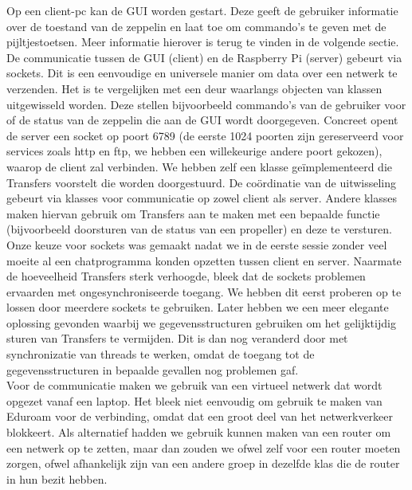 \documentclass[eind]{penoverslag}
\begin{document}
Op een client-pc kan de GUI worden gestart. Deze geeft de gebruiker informatie over de toestand van de zeppelin en laat toe om commando's te geven met de pijltjestoetsen. Meer informatie hierover is terug te vinden in de volgende sectie. \\

De communicatie tussen de GUI (client) en de Raspberry Pi (server) gebeurt via sockets. Dit is een eenvoudige en universele manier om data over een netwerk te verzenden. Het is te vergelijken met een deur waarlangs objecten van klassen uitgewisseld worden. Deze stellen bijvoorbeeld commando's van de gebruiker voor of de status van de zeppelin die aan de GUI wordt doorgegeven. Concreet opent de server een socket op poort 6789 (de eerste 1024 poorten zijn gereserveerd voor services zoals http en ftp, we hebben een willekeurige andere poort gekozen), waarop de client zal verbinden. We hebben zelf een klasse ge\"implementeerd die Transfers voorstelt die worden doorgestuurd. De co\"ordinatie van de uitwisseling gebeurt via klasses voor communicatie op zowel client als server. Andere klasses maken hiervan gebruik om Transfers aan te maken met een bepaalde functie (bijvoorbeeld doorsturen van de status van een propeller) en deze te versturen. \\

Onze keuze voor sockets was gemaakt nadat we in de eerste sessie zonder veel moeite al een chatprogramma konden opzetten tussen client en server. Naarmate de hoeveelheid Transfers sterk verhoogde, bleek dat de sockets problemen ervaarden met ongesynchroniseerde toegang. We hebben dit eerst proberen op te lossen door meerdere sockets te gebruiken. Later hebben we een meer elegante oplossing gevonden waarbij we gegevensstructuren gebruiken om het gelijktijdig sturen van Transfers te vermijden. Dit is dan nog veranderd door met synchronizatie van threads te werken, omdat de toegang tot de gegevensstructuren in bepaalde gevallen nog problemen gaf. \\

Voor de communicatie maken we gebruik van een virtueel netwerk dat wordt opgezet vanaf een laptop. Het bleek niet eenvoudig om gebruik te maken van Eduroam voor de verbinding, omdat dat een groot deel van het netwerkverkeer blokkeert. Als alternatief hadden we gebruik kunnen maken van een router om een netwerk op te zetten, maar dan zouden we ofwel zelf voor een router moeten zorgen, ofwel afhankelijk zijn van een andere groep in dezelfde klas die de router in hun bezit hebben. \\
\end{document}

